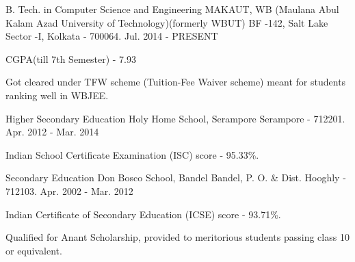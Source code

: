 


\begin{cventries}


\cventry
{B. Tech.  in Computer Science and Engineering} %
{MAKAUT, WB (Maulana Abul Kalam Azad University of Technology)\newline (formerly WBUT)} %
{BF -142, Salt Lake Sector -I, \newline
Kolkata - 700064.} %
{Jul. 2014 - PRESENT} %
{ %
\begin{cvitems}
\item {CGPA(till 7th Semester) - 7.93}
\item {Got cleared under TFW scheme (Tuition-Fee Waiver scheme) meant for students ranking well in WBJEE.}
\end{cvitems}
}


\cventry
{Higher Secondary Education} %
{Holy Home School, Serampore} %
{Serampore - 712201.} %
{Apr. 2012 - Mar. 2014} %
{ %
\begin{cvitems}
\item {Indian School Certificate Examination (ISC) score - 95.33\%.}
\end{cvitems}
}


\cventry
{Secondary Education} %
{Don Bosco School, Bandel} %
{Bandel, P. O. \& Dist. Hooghly - 712103.} %
{Apr. 2002 - Mar. 2012} %
{ %
\begin{cvitems}
\item {Indian Certificate of Secondary Education (ICSE) score  - 93.71\%.}
\item {Qualified for Anant Scholarship, provided to meritorious students passing class 10 or equivalent.}
\end{cvitems}
}


\end{cventries}